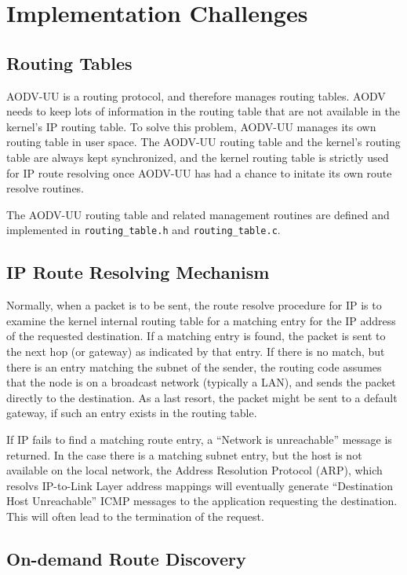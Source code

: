 \documentclass[swedish,10pt,twocolumn]{article}
\begin{document}
\section{Implementation Challenges}

\subsection{Routing Tables}

AODV-UU is a routing protocol, and therefore manages routing
tables. AODV needs to keep lots of information in the routing table
that are not available in the kernel's IP routing table. To solve this
problem, AODV-UU manages its own routing table in user space. The
AODV-UU routing table and the kernel's routing table are always kept
synchronized, and the kernel routing table is strictly used for IP
route resolving once AODV-UU has had a chance to initate its own route
resolve routines.

The AODV-UU routing table and related management routines are defined
and implemented in {\tt routing\_table.h} and {\tt routing\_table.c}.

\subsection{IP Route Resolving Mechanism}

Normally, when a packet is to be sent, the route resolve procedure
for IP is to examine the kernel internal routing table for a matching
entry for the IP address of the requested destination. If a matching
entry is found, the packet is sent to the next hop (or gateway) as
indicated by that entry. If there is no match, but there is an entry
matching the subnet of the sender, the routing code assumes that the
node is on a broadcast network (typically a LAN), and sends the packet
directly to the destination. As a last resort, the packet might be
sent to a default gateway, if such an entry exists in the routing
table.

If IP fails to find a matching route entry, a ``Network is unreachable''
message is returned. In the case there is a matching subnet entry, but
the host is not available on the local network, the Address Resolution
Protocol (ARP), which resolvs IP-to-Link Layer address mappings will
eventually generate ``Destination Host Unreachable'' ICMP messages to
the application requesting the destination. This will often lead to
the termination of the request.

\subsection{On-demand Route Discovery}
\end{document}
